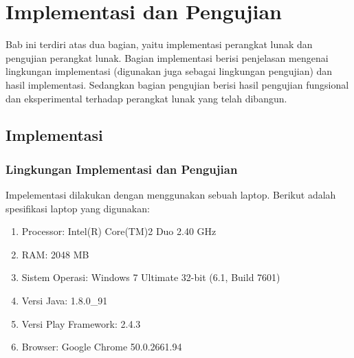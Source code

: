 \chapter{Implementasi dan Pengujian}
\label{chap:implementasipengujian}
Bab ini terdiri atas dua bagian, yaitu implementasi perangkat lunak dan pengujian perangkat lunak. Bagian implementasi berisi penjelasan mengenai lingkungan implementasi (digunakan juga sebagai lingkungan pengujian) dan hasil implementasi. Sedangkan bagian pengujian berisi hasil pengujian fungsional dan eksperimental terhadap perangkat lunak yang telah dibangun.

\section{Implementasi}
\label{sec:implementasi}

\subsection{Lingkungan Implementasi dan Pengujian}
\label{sec:lingkunganimplementasi}
Impelementasi dilakukan dengan menggunakan sebuah laptop. Berikut adalah spesifikasi laptop yang digunakan:
\begin{enumerate}
	\item Processor: Intel(R) Core(TM)2 Duo 2.40 GHz
	\item RAM: 2048 MB
	\item Sistem Operasi: Windows 7 Ultimate 32-bit (6.1, Build 7601)
	\item Versi Java: 1.8.0\_91
	\item Versi Play Framework: 2.4.3
	\item Browser: Google Chrome 50.0.2661.94
\end{enumerate}

